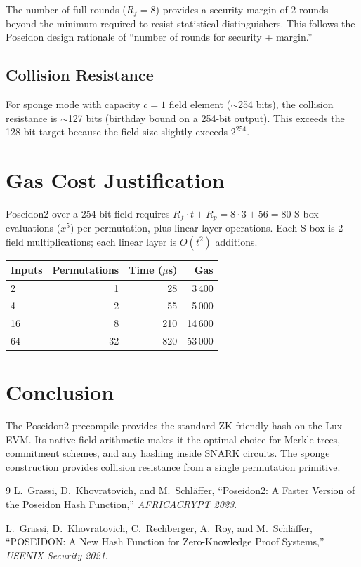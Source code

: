 \documentclass[11pt,a4paper]{article}
\begin{document}
The number of full rounds ($R_f = 8$) provides a security margin of 2 rounds
beyond the minimum required to resist statistical distinguishers. This follows
the Poseidon design rationale of ``number of rounds for security + margin.''

\subsection{Collision Resistance}

For sponge mode with capacity $c = 1$ field element ($\sim$254 bits), the
collision resistance is $\sim$127 bits (birthday bound on a 254-bit output).
This exceeds the 128-bit target because the field size slightly exceeds $2^{254}$.

\section{Gas Cost Justification}

Poseidon2 over a 254-bit field requires $R_f \cdot t + R_p = 8 \cdot 3 + 56 = 80$
S-box evaluations ($x^5$) per permutation, plus linear layer operations.
Each S-box is 2 field multiplications; each linear layer is $O(t^2)$ additions.

\begin{table}[H]
\centering
\begin{tabular}{lrrr}
\toprule
\textbf{Inputs} & \textbf{Permutations} & \textbf{Time ($\mu$s)} & \textbf{Gas} \\
\midrule
2 & 1 & 28 & 3\,400 \\
4 & 2 & 55 & 5\,000 \\
16 & 8 & 210 & 14\,600 \\
64 & 32 & 820 & 53\,000 \\
\bottomrule
\end{tabular}
\end{table}

\section{Conclusion}

The Poseidon2 precompile provides the standard ZK-friendly hash on the Lux EVM.
Its native field arithmetic makes it the optimal choice for Merkle trees,
commitment schemes, and any hashing inside SNARK circuits. The sponge construction
provides collision resistance from a single permutation primitive.

\begin{thebibliography}{9}
  L.~Grassi, D.~Khovratovich, and M.~Schl\"affer,
  ``Poseidon2: A Faster Version of the Poseidon Hash Function,''
  \textit{AFRICACRYPT 2023}.

  L.~Grassi, D.~Khovratovich, C.~Rechberger, A.~Roy, and M.~Schl\"affer,
  ``POSEIDON: A New Hash Function for Zero-Knowledge Proof Systems,''
  \textit{USENIX Security 2021}.
\end{thebibliography}
\end{document}
